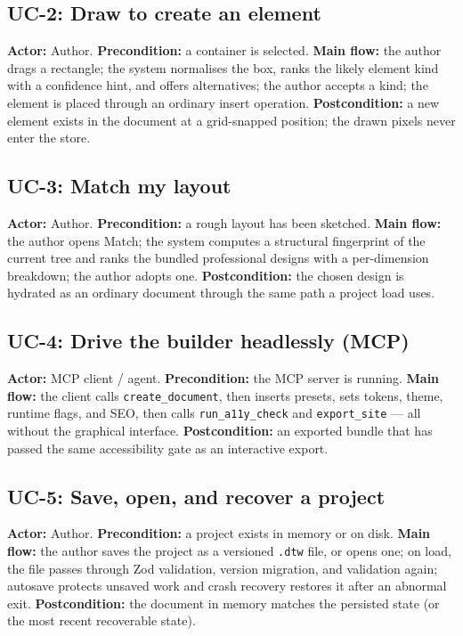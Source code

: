 \subsection*{UC-2: Draw to create an element}
\textbf{Actor:} Author. \quad\textbf{Precondition:} a container is selected.
\textbf{Main flow:} the author drags a rectangle; the system normalises the box,
ranks the likely element kind with a confidence hint, and offers alternatives; the
author accepts a kind; the element is placed through an ordinary insert operation.
\textbf{Postcondition:} a new element exists in the document at a grid-snapped
position; the drawn pixels never enter the store.

\subsection*{UC-3: Match my layout}
\textbf{Actor:} Author. \quad\textbf{Precondition:} a rough layout has been sketched.
\textbf{Main flow:} the author opens Match; the system computes a structural
fingerprint of the current tree and ranks the bundled professional designs with a
per-dimension breakdown; the author adopts one. \textbf{Postcondition:} the chosen
design is hydrated as an ordinary document through the same path a project load
uses.

\subsection*{UC-4: Drive the builder headlessly (MCP)}
\textbf{Actor:} MCP client / agent. \quad\textbf{Precondition:} the MCP server is
running. \textbf{Main flow:} the client calls \texttt{create\_document}, then
inserts presets, sets tokens, theme, runtime flags, and SEO, then calls
\texttt{run\_a11y\_check} and \texttt{export\_site} --- all without the graphical
interface. \textbf{Postcondition:} an exported bundle that has passed the same
accessibility gate as an interactive export.

\subsection*{UC-5: Save, open, and recover a project}
\textbf{Actor:} Author. \quad\textbf{Precondition:} a project exists in memory or
on disk. \textbf{Main flow:} the author saves the project as a versioned
\texttt{.dtw} file, or opens one; on load, the file passes through Zod validation,
version migration, and validation again; autosave protects unsaved work and crash
recovery restores it after an abnormal exit. \textbf{Postcondition:} the document
in memory matches the persisted state (or the most recent recoverable state).
